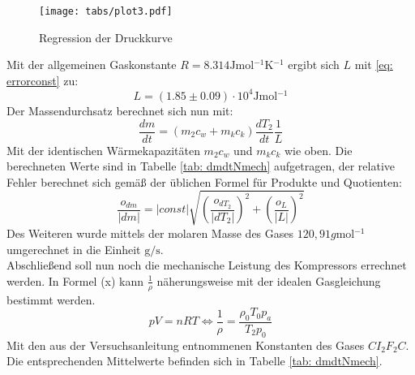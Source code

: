 \begin{figure}
  \centering
  \texttt{[image: tabs/plot3.pdf]}
  \caption{Regression der Druckkurve}
  \label{fig: plot3}
\end{figure}

Mit der allgemeinen Gaskonstante $R = 8.314\si{\joule \mol^{-1} \kelvin^{-1}}$ ergibt sich $L$  mit \eqref{eq: errorconst} zu:
\begin{equation}
  L = (1.85 \pm 0.09)\cdot 10^{4} \si{\joule \mol^{-1}}
\end{equation}
Der Massendurchsatz berechnet sich nun mit:
\begin{equation}
  \frac{dm}{dt} = (m_2 c_w + m_k c_k)\frac{dT_2}{dt} \frac{1}{L}
\end{equation}
Mit der identischen Wärmekapazitäten $m_2 c_w$ und $m_k c_k$ wie oben. Die berechneten Werte sind in Tabelle \ref{tab: dmdtNmech} aufgetragen, der relative Fehler berechnet sich gemäß der üblichen Formel
für Produkte und Quotienten:
\begin{equation}
  \frac{o_{dm}}{\left| dm \right|} = \left| const \right| \sqrt{\left(\frac{o_{dT_2}}{\left| dT_2 \right|}\right)^2 + \left(\frac{o_{L}}{\left| L \right|}\right)^2}
\end{equation}
Des Weiteren wurde mittels der molaren Masse des Gases $120,91 \si{g \mol ^{-1}}$ \cite{demtröder} umgerechnet in die Einheit $\si{\gram \per \second}$.  \\
Abschließend soll nun noch die mechanische Leistung des Kompressors errechnet werden. In Formel (x) kann $\frac{1}{\rho}$
näherungsweise mit der idealen Gasgleichung bestimmt werden.
\begin{equation}
  pV = nRT \Leftrightarrow  \frac{1}{\rho} = \frac{\rho_0 T_0 p_a}{T_2 p_0}
\end{equation}
Mit den aus der Versuchsanleitung \cite{anleitung206} entnommenen Konstanten des Gases $CI_2F_2C$. Die entsprechenden Mittelwerte befinden sich in Tabelle \ref{tab: dmdtNmech}.






